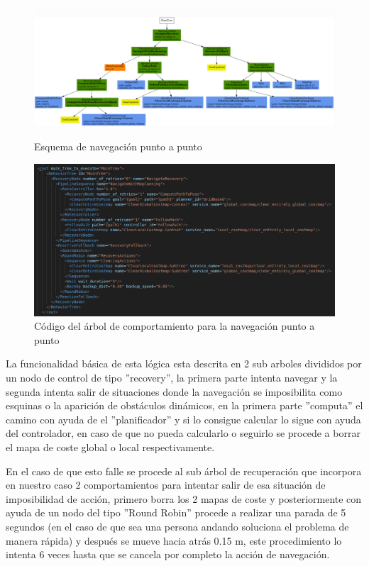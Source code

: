 \begin{figure}[htbp]
  \centering
  \begin{minipage}[b]{0.45\textwidth}
    \centering
    \includegraphics[width=\textwidth]{images/bt_ToPose_wrec_rep.png}
    \caption{Esquema de navegación punto a punto}
    \label{fig:bt_ToPose}
  \end{minipage}
  \hfill
  \begin{minipage}[b]{0.45\textwidth}
    \centering
    \includegraphics[width=\textwidth]{images/bt_ToPose_script.png}
    \caption{Código del árbol de comportamiento para la navegación punto a punto}
    \label{fig:bt_ToPose_script}
  \end{minipage}
\end{figure}

La funcionalidad básica de esta lógica esta descrita en 2 sub arboles divididos por un nodo de control de tipo ''recovery'', la primera parte intenta navegar 
y la segunda intenta salir de situaciones donde la navegación se imposibilita como esquinas o la aparición de obstáculos dinámicos, en la primera parte 
''computa'' el camino con ayuda de el ''planificador'' y si lo consigue calcular lo sigue con ayuda del controlador, en caso de que no pueda calcularlo o seguirlo 
se procede a borrar el mapa de coste global o local respectivamente.

En el caso de que esto falle se procede al sub árbol de recuperación que incorpora en nuestro caso 2 comportamientos para intentar salir de esa situación de imposibilidad de acción, 
primero borra los 2 mapas de coste y posteriormente con ayuda de un nodo del tipo ''Round Robin'' procede a realizar una parada de 5 segundos (en el caso de que sea una persona andando soluciona el problema de manera rápida) y 
después se mueve hacia atrás 0.15 m, este procedimiento lo intenta 6 veces hasta que se cancela por completo la acción de navegación.

